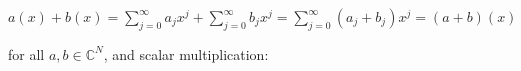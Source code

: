 $a(x) + b(x) = \sum_{j=0}^{\infty} a_j x^j + \sum_{j=0}^{\infty} b_j x^j = \sum_{j=0}^{\infty} (a_j + b_j) x^j = (a + b)(x)$

for all $a, b \in \mathbb{C}^N$, and scalar multiplication:
